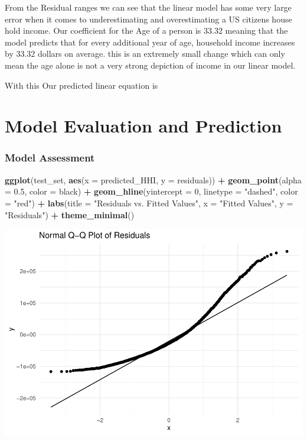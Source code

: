 \documentclass[
]{article}
\newenvironment{Shaded}{\begin{snugshade}}{\end{snugshade}}
\newcommand{\AttributeTok}[1]{\textcolor[rgb]{0.13,0.29,0.53}{#1}}
\newcommand{\DecValTok}[1]{\textcolor[rgb]{0.00,0.00,0.81}{#1}}
\newcommand{\FloatTok}[1]{\textcolor[rgb]{0.00,0.00,0.81}{#1}}
\newcommand{\FunctionTok}[1]{\textcolor[rgb]{0.13,0.29,0.53}{\textbf{#1}}}
\newcommand{\NormalTok}[1]{#1}
\newcommand{\SpecialCharTok}[1]{\textcolor[rgb]{0.81,0.36,0.00}{\textbf{#1}}}
\newcommand{\StringTok}[1]{\textcolor[rgb]{0.31,0.60,0.02}{#1}}
\begin{document}
From the Residual ranges we can see that the linear model has some very
large error when it comes to underestimating and overestimating a US
citizens house hold income. Our coefficient for the Age of a person is
33.32 meaning that the model predicts that for every additional year of
age, household income increases by 33.32 dollars on average. this is an
extremely small change which can only mean the age alone is not a very
strong depiction of income in our linear model.

With this Our predicted linear equation is

\section{Model Evaluation and
Prediction}\label{model-evaluation-and-prediction}

\subsubsection{Model Assessment}\label{model-assessment}

\begin{Shaded}
\begin{Highlighting}[]
\FunctionTok{ggplot}\NormalTok{(test\_set, }\FunctionTok{aes}\NormalTok{(}\AttributeTok{x =}\NormalTok{ predicted\_HHI, }\AttributeTok{y =}\NormalTok{ residuals)) }\SpecialCharTok{+}
  \FunctionTok{geom\_point}\NormalTok{(}\AttributeTok{alpha =} \FloatTok{0.5}\NormalTok{, }\AttributeTok{color =} \StringTok{\textquotesingle{}black\textquotesingle{}}\NormalTok{) }\SpecialCharTok{+}
  \FunctionTok{geom\_hline}\NormalTok{(}\AttributeTok{yintercept =} \DecValTok{0}\NormalTok{, }\AttributeTok{linetype =} \StringTok{"dashed"}\NormalTok{, }\AttributeTok{color =} \StringTok{"red"}\NormalTok{) }\SpecialCharTok{+}
  \FunctionTok{labs}\NormalTok{(}\AttributeTok{title =} \StringTok{"Residuals vs. Fitted Values"}\NormalTok{,}
       \AttributeTok{x =} \StringTok{"Fitted Values"}\NormalTok{,}
       \AttributeTok{y =} \StringTok{"Residuals"}\NormalTok{) }\SpecialCharTok{+}
  \FunctionTok{theme\_minimal}\NormalTok{()}
\end{Highlighting}
\end{Shaded}

\includegraphics{Project_1_456_files/figure-latex/unnamed-chunk-15-1.pdf}
\end{document}
